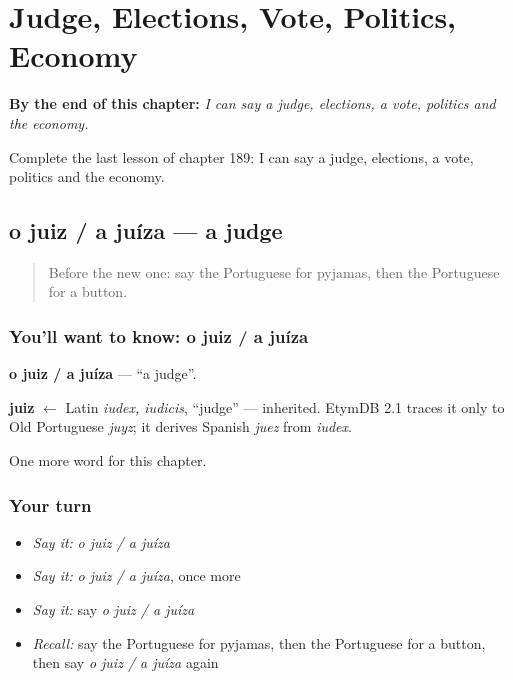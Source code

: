 
\chapter{Judge, Elections, Vote, Politics, Economy}
\label{ch:pt-judge-elections-vote-politics-economy}

\begin{chapteropening}
\textbf{By the end of this chapter:} \emph{I can say a judge, elections, a vote, politics and the economy.}

Complete the last lesson of chapter 189: I can say a judge, elections, a vote, politics and the economy.
\end{chapteropening}

\section[o juiz / a juíza]{o juiz / a juíza — a judge}

\label{lesson:PT-C189-juiz-a-juiza}



\begin{quote}
Before the new one: say the Portuguese for pyjamas, then the Portuguese for a button.
\end{quote}

\subsection*{You'll want to know: o juiz / a juíza}
\textbf{o juiz / a juíza} — \textquotedblleft{}a judge\textquotedblright{}.

\begin{cousinweb}
\textbf{juiz} $\leftarrow$ Latin \emph{iudex, iudicis}, \textquotedblleft{}judge\textquotedblright{} — inherited. EtymDB 2.1 traces it only to Old Portuguese \emph{juyz}; it derives Spanish \emph{juez} from \emph{iudex}.
\end{cousinweb}

\begin{grammarlens}[title={What you've built}]
One more word for this chapter.
\end{grammarlens}

\subsection*{Your turn}
\begin{itemize}
\raggedright
  \item \emph{Say it:} \emph{o juiz / a juíza}
  \item \emph{Say it:} \emph{o juiz / a juíza}, once more
  \item \emph{Say it:} say \emph{o juiz / a juíza}
  \item \emph{Recall:} say the Portuguese for pyjamas, then the Portuguese for a button, then say \emph{o juiz / a juíza} again
\end{itemize}

